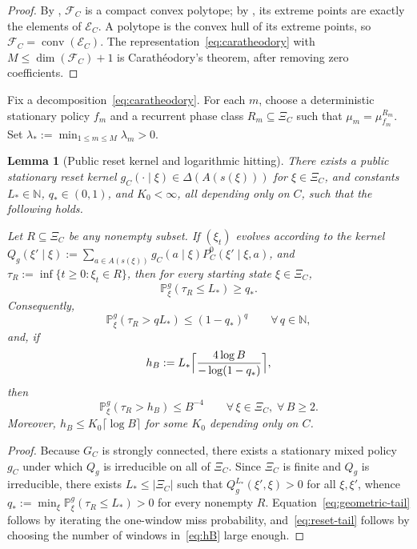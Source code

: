 \documentclass[12pt,a4paper]{article}
\newtheorem{lemma}[theorem]{Lemma}
\theoremstyle{definition}
\newcommand{\N}{\mathbb{N}}
\DeclareMathOperator{\conv}{conv}
\begin{document}
\begin{proof}
By , $\mathcal{F}_C$ is a compact convex polytope; by , its extreme points are exactly the elements of $\mathcal{E}_C$. A polytope is the convex hull of its extreme points, so $\mathcal{F}_C = \conv(\mathcal{E}_C)$. The representation~\eqref{eq:caratheodory} with $M \leq \dim(\mathcal{F}_C) + 1$ is Carath\'eodory's theorem, after removing zero coefficients.
\end{proof}

Fix a decomposition~\eqref{eq:caratheodory}. For each $m$, choose a deterministic stationary policy $f_m$ and a recurrent phase class $R_m \subseteq \Xi_C$ such that $\mu_m = \mu_{f_m}^{R_m}$. Set $\lambda_\ast := \min_{1 \leq m \leq M} \lambda_m > 0$.

\begin{lemma}[Public reset kernel and logarithmic hitting]\label{lem:reset}
There exists a public stationary reset kernel $g_C(\cdot \mid \xi) \in \Delta(A(s(\xi)))$ for $\xi \in \Xi_C$, and constants $L_\ast \in \N$, $q_\ast \in (0,1)$, and $K_0 < \infty$, all depending only on $C$, such that the following holds.

Let $R \subseteq \Xi_C$ be any nonempty subset. If $(\xi_t)$ evolves according to the kernel $Q_g(\xi' \mid \xi) := \sum_{a \in A(s(\xi))} g_C(a \mid \xi) P_C^0(\xi' \mid \xi, a)$, and $\tau_R := \inf\{t \geq 0 : \xi_t \in R\}$, then for every starting state $\xi \in \Xi_C$,
\begin{equation}\label{eq:L-star-hit}
\mathbb{P}_\xi^g(\tau_R \leq L_\ast) \geq q_\ast.
\end{equation}
Consequently,
\begin{equation}\label{eq:geometric-tail}
\mathbb{P}_\xi^g(\tau_R > qL_\ast) \leq (1 - q_\ast)^q \qquad \forall\, q \in \N,
\end{equation}
and, if
\begin{equation}\label{eq:hB}
h_B := L_\ast \Bigl\lceil \frac{4 \log B}{-\log(1 - q_\ast)} \Bigr\rceil,
\end{equation}
then
\begin{equation}\label{eq:reset-tail}
\mathbb{P}_\xi^g(\tau_R > h_B) \leq B^{-4} \qquad \forall\, \xi \in \Xi_C,\; \forall\, B \geq 2.
\end{equation}
Moreover, $h_B \leq K_0 \lceil \log B \rceil$ for some $K_0$ depending only on $C$.
\end{lemma}

\begin{proof}
Because $G_C$ is strongly connected, there exists a stationary mixed policy $g_C$ under which $Q_g$ is irreducible on all of $\Xi_C$. Since $\Xi_C$ is finite and $Q_g$ is irreducible, there exists $L_\ast \leq |\Xi_C|$ such that $Q_g^{L_\ast}(\xi', \xi) > 0$ for all $\xi, \xi'$, whence $q_\ast := \min_{\xi} \mathbb{P}_\xi^g(\tau_R \leq L_\ast) > 0$ for every nonempty $R$.  Equation~\eqref{eq:geometric-tail} follows by iterating the one-window miss probability, and~\eqref{eq:reset-tail} follows by choosing the number of windows in~\eqref{eq:hB} large enough.
\end{proof}
\end{document}
